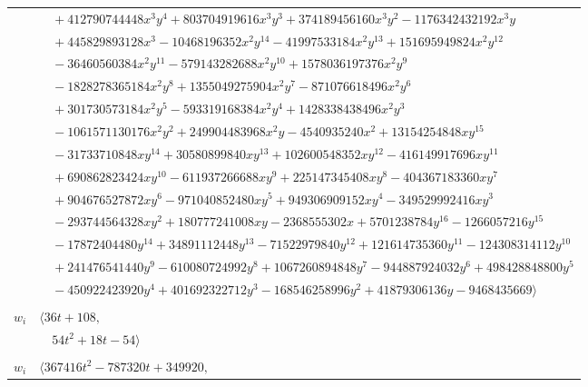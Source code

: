 \documentclass[11pt]{article}
\begin{document}
\begin{longtable}{@{}ll@{}}
 & $\quad +412790744448x^{3}y^{4}+803704919616x^{3}y^{3}+374189456160x^{3}y^{2}-1176342432192x^{3}y$\\
 & $\quad +445829893128x^{3}-10468196352x^{2}y^{14}-41997533184x^{2}y^{13}+151695949824x^{2}y^{12}$\\
 & $\quad -36460560384x^{2}y^{11}-579143282688x^{2}y^{10}+1578036197376x^{2}y^{9}$\\
 & $\quad -1828278365184x^{2}y^{8}+1355049275904x^{2}y^{7}-871076618496x^{2}y^{6}$\\
 & $\quad +301730573184x^{2}y^{5}-593319168384x^{2}y^{4}+1428338438496x^{2}y^{3}$\\
 & $\quad -1061571130176x^{2}y^{2}+249904483968x^{2}y-4540935240x^{2}+13154254848xy^{15}$\\
 & $\quad -31733710848xy^{14}+30580899840xy^{13}+102600548352xy^{12}-416149917696xy^{11}$\\
 & $\quad +690862823424xy^{10}-611937266688xy^{9}+225147345408xy^{8}-404367183360xy^{7}$\\
 & $\quad +904676527872xy^{6}-971040852480xy^{5}+949306909152xy^{4}-349529992416xy^{3}$\\
 & $\quad -293744564328xy^{2}+180777241008xy-2368555302x+5701238784y^{16}-1266057216y^{15}$\\
 & $\quad -17872404480y^{14}+34891112448y^{13}-71522979840y^{12}+121614735360y^{11}-124308314112y^{10}$\\
 & $\quad +241476541440y^{9}-610080724992y^{8}+1067260894848y^{7}-944887924032y^{6}+498428848800y^{5}$\\
 & $\quad -450922423920y^{4}+401692322712y^{3}-168546258996y^{2}+41879306136y-9468435669\rangle$\\
\addlinespace[2pt]
\multicolumn{2}{@{}p{0.97\textwidth}@{}}{$i=12$, $D_i=6$, $e_i=0$, $\rho_{ij}$: $1{:}1, \allowbreak 2{:}1, \allowbreak 23{:}1, \allowbreak 28{:}2, \allowbreak 31{:}1, \allowbreak 32{:}1, \allowbreak 37{:}1$}\\
$w_i$ & $\langle 36t+108,$\\
 & $\quad 54t^{2}+18t-54\rangle$\\
\addlinespace[2pt]
\multicolumn{2}{@{}p{0.97\textwidth}@{}}{$i=13$, $D_i=108$, $e_i=1$, $\rho_{ij}$: $0{:}1, \allowbreak 1{:}2, \allowbreak 17{:}1, \allowbreak 18{:}1, \allowbreak 21{:}2, \allowbreak 24{:}2, \allowbreak 25{:}2, \allowbreak 26{:}1, \allowbreak 27{:}2, \allowbreak 30{:}1, \allowbreak 32{:}2, \allowbreak 37{:}2, \allowbreak 39{:}2, \allowbreak 42{:}1$}\\
$w_i$ & $\langle 367416t^{2}-787320t+349920,$\\

\end{longtable}
\end{document}
